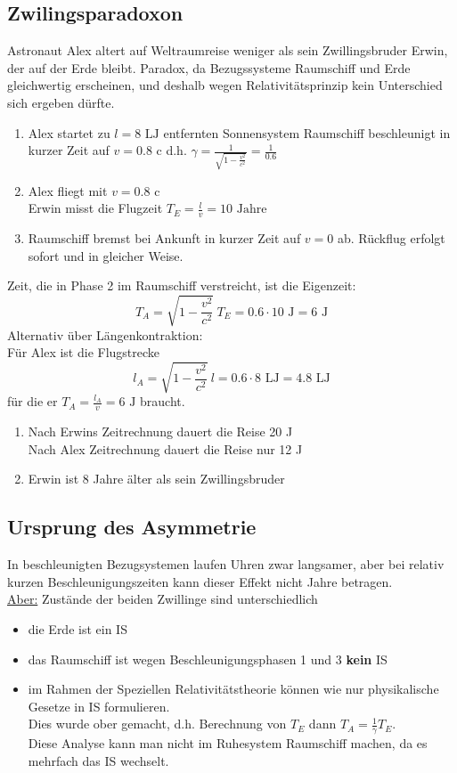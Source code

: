 \documentclass[titlepage,12pt,a4paper,ngerman]{report}
\newcommand{\tx}[1]{\textrm{#1}}
\begin{document}
\subsection{Zwilingsparadoxon}
Astronaut Alex altert auf Weltraumreise weniger als sein Zwillingsbruder Erwin, der auf der Erde bleibt. Paradox, da Bezugssysteme Raumschiff und Erde gleichwertig erscheinen, und deshalb wegen Relativitätsprinzip kein Unterschied sich ergeben dürfte.
\begin{enumerate}[1)]
	\item Alex startet zu $ l=8 \tx{ LJ} $ entfernten Sonnensystem Raumschiff beschleunigt in kurzer Zeit auf $ v = 0.8 \tx{ c} $ d.h. $ \gamma = \frac{1}{\sqrt{1 - \frac{v^2}{c^2}}} = \frac{1}{0.6} $
	\item Alex fliegt mit $ v = 0.8 \tx{ c} $\\
	Erwin misst die Flugzeit  $ T_E = \frac{l}{v} = 10 \tx{ Jahre} $
	\item Raumschiff bremst bei Ankunft in kurzer Zeit auf $ v = 0 $ ab. Rückflug erfolgt sofort und in gleicher Weise.
\end{enumerate}
Zeit, die in Phase 2 im Raumschiff verstreicht, ist die Eigenzeit:
$$T_A = \sqrt{1-\frac{v^2}{c^2}}\  T_E = 0.6 \cdot 10 \tx{ J} = 6 \tx{ J}$$
Alternativ über Längenkontraktion:\\
Für Alex ist die Flugstrecke
$$l_A = \sqrt{1-\frac{v^2}{c^2}}\  l = 0.6 \cdot 8 \tx{ LJ} = 4.8 \tx{ LJ}$$
für die er $ T_A = \frac{l_A}{v} = 6 \tx{ J} $ braucht.
\begin{enumerate}[$ \rightarrow $]
	\item Nach Erwins Zeitrechnung dauert die Reise 20 J\\
	Nach Alex Zeitrechnung dauert die Reise nur 12 J
	\item Erwin ist 8 Jahre älter als sein Zwillingsbruder
\end{enumerate}
\subsection{Ursprung des Asymmetrie}
In beschleunigten Bezugsystemen laufen Uhren zwar langsamer, aber bei relativ kurzen Beschleunigungszeiten kann dieser Effekt nicht Jahre betragen.\\[5pt]
\underline{Aber:} Zustände der beiden Zwillinge sind unterschiedlich
\begin{itemize}
	\item die Erde ist ein IS
	\item das Raumschiff ist wegen Beschleunigungsphasen 1 und 3 \textbf{kein} IS
	\item im Rahmen der Speziellen Relativitätstheorie können wie nur physikalische Gesetze in IS formulieren. \\
	Dies wurde ober gemacht, d.h. Berechnung von $ T_E $ dann $ T_A = \frac{1}{\gamma} T_E $.\\
	Diese Analyse kann man nicht im Ruhesystem Raumschiff machen, da es mehrfach das IS wechselt.
\end{itemize}
\end{document}

